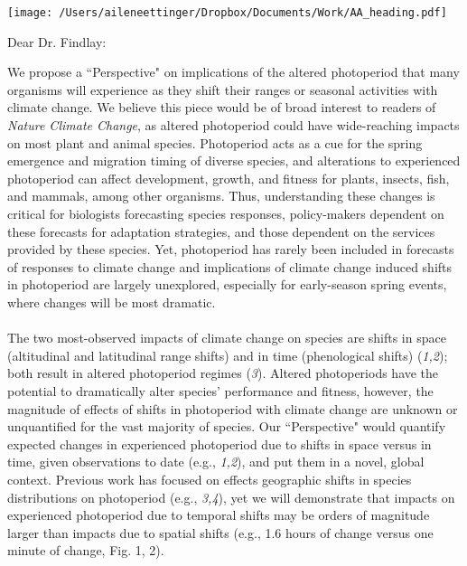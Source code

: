 \documentclass[10.5pt,a4paper]{letter}
\begin{document}

\begin{letter}{}
\texttt{[image: /Users/aileneettinger/Dropbox/Documents/Work/AA\_heading.pdf]}

\opening{Dear Dr. Findlay:}
We propose a ``Perspective" on implications of the altered photoperiod that many organisms will experience as they shift their ranges or seasonal activities with climate change. 
We believe this piece would be of broad interest to readers of \emph{Nature Climate Change}, as altered photoperiod could have wide-reaching impacts on most plant and animal species. Photoperiod acts as a cue for the spring emergence and migration timing of diverse species, and alterations to experienced photoperiod can affect development, growth, and fitness for plants, insects, fish, and mammals, among other organisms. Thus, understanding these changes is critical for biologists forecasting species responses, policy-makers dependent on these forecasts for adaptation strategies, and those dependent on the services provided by these species. Yet, photoperiod has rarely been included in forecasts of responses to climate change and implications of climate change induced shifts in photoperiod are largely unexplored, especially for early-season spring events, where changes will be most dramatic. 
\\
\\
The two most-observed impacts of climate change on species are shifts in space (altitudinal and latitudinal range shifts) and in time (phenological shifts) (\emph{1,2}); both result in altered photoperiod regimes (\emph{3}).  Altered photoperiods have the potential to dramatically alter species' performance and fitness, however, the magnitude of effects of shifts in photoperiod with climate change are unknown or unquantified for the vast majority of species.  Our ``Perspective" would quantify expected changes in experienced photoperiod due to shifts in space versus in time, given observations to date (e.g., \emph{1,2}), and put them in a novel, global context. Previous work has focused on effects geographic shifts in species distributions on photoperiod (e.g., \emph{3,4}), yet we will demonstrate that impacts on experienced photoperiod due to temporal shifts may be orders of magnitude larger than impacts due to spatial shifts (e.g., 1.6 hours of change versus one minute of change, Fig. 1, 2). 
\\
\\

\end{letter}
\end{document}
